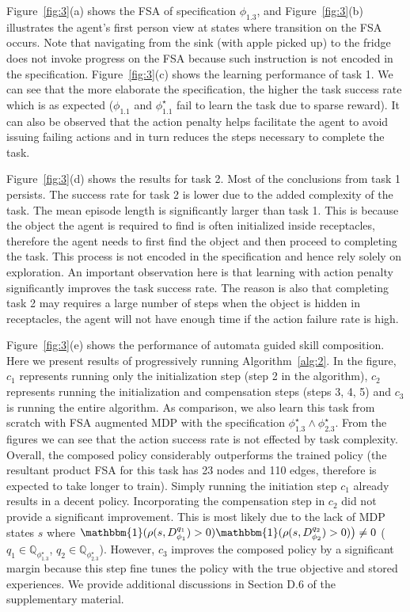 \documentclass{article}
\begin{document}
Figure~\ref{fig:3}(a) shows the FSA of specification $\phi_{1.3}$, and Figure~\ref{fig:3}(b) illustrates the agent's first person view at states where transition on the FSA occurs. Note that navigating from the sink (with apple picked up) to the fridge does not invoke progress on the FSA because such instruction is not encoded in the specification. Figure~\ref{fig:3}(c) shows the learning performance of task 1. We can see that the more elaborate the specification, the higher the task success rate which is as expected ($\phi_{1.1}$ and $\phi^\star_{1.1}$ fail to learn the task due to sparse reward). It can also be observed that the action penalty helps facilitate the agent to avoid issuing failing actions and in turn reduces the steps necessary to complete the task. 


Figure~\ref{fig:3}(d) shows the results for task 2. Most of the conclusions from task 1 persists. The success rate for task 2 is lower due to the added complexity of the task. The mean episode length is significantly larger than task 1. This is because the object the agent is required to find is often initialized inside receptacles, therefore the agent needs to first find the object and then proceed to completing the task. This process is not encoded in the specification and hence rely solely on exploration. An important observation here is that learning with action penalty significantly improves the task success rate. The reason is also that completing task 2 may requires a large number of steps when the object is hidden in receptacles, the agent will not have enough time if the action failure rate is high.  

Figure~\ref{fig:3}(e) shows the performance of automata guided skill composition. Here we present results of progressively running Algorithm~\ref{alg:2}. In the figure, $c_1$ represents running only the initialization step (step 2 in the algorithm), $c_2$ represents running the initialization and compensation steps (steps 3, 4, 5) and $c_3$ is running the entire algorithm. As comparison, we also learn this task from scratch with FSA augmented MDP with the specification $\phi^\star_{1.3} \wedge \phi^\star_{2.3}$. From the figures we can see that the action success rate is not effected by task complexity. Overall, the composed policy considerably outperforms the trained policy (the resultant product FSA for this task has 23 nodes and 110 edges, therefore is expected to take longer to train). Simply running the initiation step $c_1$ already results in a decent policy. Incorporating the compensation step in $c_2$ did not provide a significant improvement. This is most likely due to the lack of MDP states $s$ where $\mathbbm{1}(\rho(s,D_{\phi_1}^{q_{1}})>0)\mathbbm{1}(\rho(s,D_{\phi_2}^{q_{2}})>0)\big) \neq 0$ ($q_1 \in \mathbb{Q}_{\phi^\star_{1.3}}$, $q_2 \in \mathbb{Q}_{\phi^\star_{2.3}}$). However, $c_3$ improves the composed policy by a significant margin because this step fine tunes the policy with the true objective and stored experiences.  We provide additional discussions in Section D.6 of the supplementary material.
\end{document}

